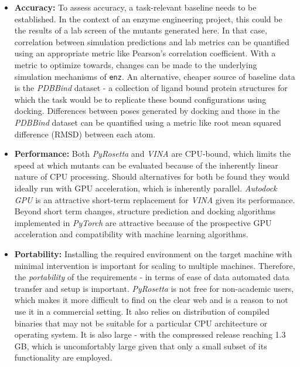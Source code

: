 \documentclass[16pt]{article}
\begin{document}
\begin{itemize}
	\item \textbf{Accuracy:} To assess accuracy, a task-relevant baseline needs to be established. 
		In the context of an enzyme engineering project, this could be the results of a lab screen of the mutants generated here.
		In that case, correlation between simulation predictions and lab metrics can be quantified using an appropriate metric like Pearson's correlation coefficient. 
		With a metric to optimize towards, changes can be made to the underlying simulation mechanisms of \texttt{enz}.
		An alternative, cheaper source of baseline data is the \textit{PDBBind}\cite{liu2015pdb} dataset - a collection of ligand bound protein structures for which the task would be to replicate these bound configurations using docking.
		Differences between poses generated by docking and those in the \textit{PDBBind} dataset can be quantified using a metric like root mean squared difference (RMSD) between each atom.
		
	\item \textbf{Performance:} Both \textit{PyRosetta} and \textit{VINA} are CPU-bound, which limits the speed at which mutants can be evaluated because of the inherently linear nature of CPU processing. 
		Should alternatives for both be found they would ideally run with GPU acceleration, which is inherently parallel.
		\textit{Autodock GPU}\cite{santos2021accelerating} is an attractive short-term replacement for \textit{VINA} given its performance. 
		Beyond short term changes, structure prediction and docking algorithms implemented in \textit{PyTorch} are attractive because of the prospective GPU acceleration and compatibility with machine learning algorithms.
	\item \textbf{Portability:} Installing the required environment on the target machine with minimal intervention is important for scaling to multiple machines.
		Therefore, the \textit{portability} of the requirements - in terms of ease of data automated data transfer and setup is important.
		\textit{PyRosetta} is not free for non-academic users, which makes it more difficult to find on the clear web and is a reason to not use it in a commercial setting.
		It also relies on distribution of compiled binaries that may not be suitable for a particular CPU architecture or operating system.
		It is also large - with the compressed release reaching 1.3 GB, which is uncomfortably large given that only a small subset of its functionality are employed.
\end{itemize}
\end{document}
